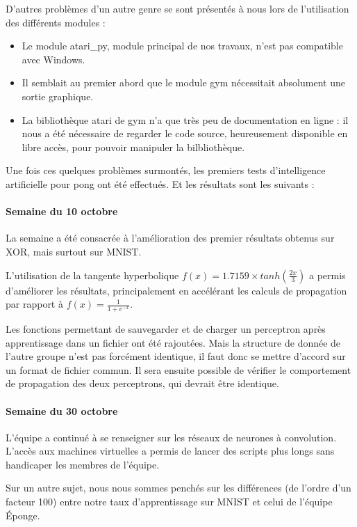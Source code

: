 \documentclass[
    10pt,
    a4paper,
    oneside,
    headinclude,footinclude,
    BCOR=5mm,
]{scrartcl}
\begin{document}
D'autres problèmes d'un autre genre se sont présentés à nous lors de l'utilisation des différents modules :
\begin{itemize}
	\item Le module atari\_py, module principal de nos travaux, n'est pas compatible avec Windows.
	\item Il semblait au premier abord que le module gym nécessitait absolument une sortie graphique.
	\item La bibliothèque atari de gym n'a que très peu de documentation en ligne : il nous a été nécessaire de regarder le code source, heureusement disponible en libre accès, pour pouvoir manipuler la bilbliothèque.
\end{itemize}

	
Une fois ces quelques problèmes surmontés, les premiers tests d'intelligence artificielle pour pong ont été effectués. Et les résultats sont les suivants :

\paragraph{Semaine du 10 octobre}

La semaine a été consacrée à l'amélioration des premier résultats obtenus sur XOR, mais surtout sur MNIST.

L'utilisation de la tangente hyperbolique $f(x) = 1.7159 \times tanh(\frac{2x}{3})$ a permis d'améliorer les résultats, principalement en accélérant les calculs de propagation par rapport à $f(x) = \frac{1}{1 + e^{-x}}$.

Les fonctions permettant de sauvegarder et de charger un perceptron après apprentissage dans un fichier ont été rajoutées. Mais la structure de donnée de l'autre groupe n'est pas forcément identique, il faut donc se mettre d'accord sur un format de fichier commun. Il sera ensuite possible de vérifier le comportement de propagation des deux perceptrons, qui devrait être identique.

\paragraph{Semaine du 30 octobre}

L'équipe a continué à se renseigner sur les réseaux de neurones à convolution. L'accès aux machines virtuelles a permis de lancer des scripts plus longs sans handicaper les membres de l'équipe.

Sur un autre sujet, nous nous sommes penchés sur les différences (de l'ordre d'un facteur 100) entre notre taux d'apprentissage sur MNIST et celui de l'équipe Éponge.
\end{document}
